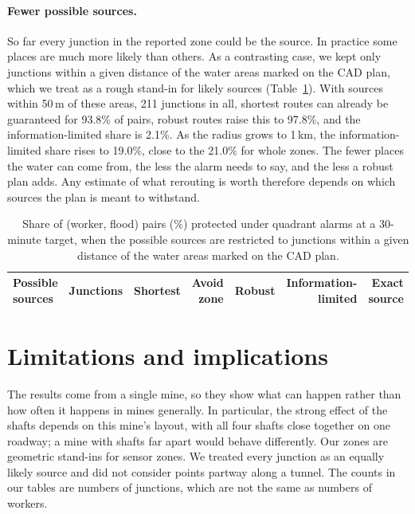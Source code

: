 \documentclass[11pt,a4paper]{article}
\begin{document}
\paragraph{Fewer possible sources.}
So far every junction in the reported zone could be the source. In practice some places are much more likely than others. As a contrasting case, we kept only junctions within a given distance of the water areas marked on the CAD plan, which we treat as a rough stand-in for likely sources (Table~\ref{tab:breadth}). With sources within 50\,m of these areas, 211 junctions in all, shortest routes can already be guaranteed for 93.8\% of pairs, robust routes raise this to 97.8\%, and the information-limited share is 2.1\%. As the radius grows to 1\,km, the information-limited share rises to 19.0\%, close to the 21.0\% for whole zones. The fewer places the water can come from, the less the alarm needs to say, and the less a robust plan adds. Any estimate of what rerouting is worth therefore depends on which sources the plan is meant to withstand.

\begin{table}[htbp]
\centering\small
\caption{Share of (worker, flood) pairs (\%) protected under quadrant alarms at a 30-minute target, when the possible sources are restricted to junctions within a given distance of the water areas marked on the CAD plan.}\label{tab:breadth}
\begin{tabular}{@{}lrrrrrr@{}}\toprule
Possible sources & Junctions & Shortest & Avoid zone & Robust & Information-limited & Exact source\\\midrule

\end{tabular}
\end{table}

\section{Limitations and implications}\label{sec:limits}
The results come from a single mine, so they show what can happen rather than how often it happens in mines generally. In particular, the strong effect of the shafts depends on this mine's layout, with all four shafts close together on one roadway; a mine with shafts far apart would behave differently. Our zones are geometric stand-ins for sensor zones. We treated every junction as an equally likely source and did not consider points partway along a tunnel. The counts in our tables are numbers of junctions, which are not the same as numbers of workers.
\end{document}

